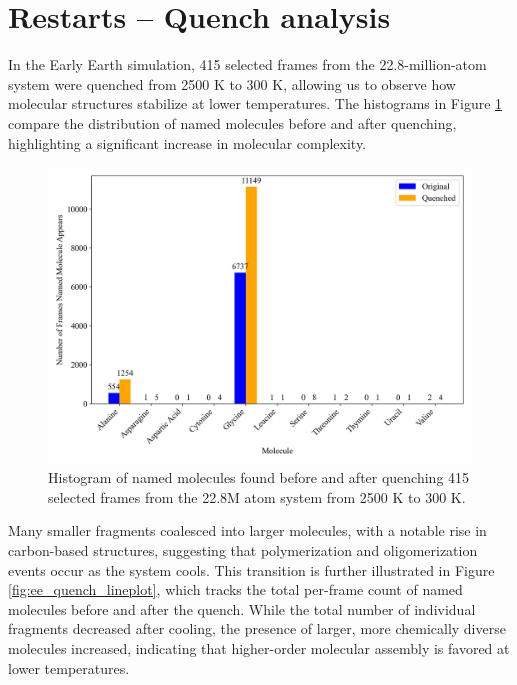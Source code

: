 \section{Restarts -- Quench analysis}
\label{sec:restarts_quench_analysis}

In the Early Earth simulation, 415 selected frames from the 22.8-million-atom system were quenched from 2500 K to 300 K, allowing us to observe how molecular structures stabilize at lower temperatures. The histograms in Figure \ref{fig:ee_quench_hist} compare the distribution of named molecules before and after quenching, highlighting a significant increase in molecular complexity. 

\begin{figure}[!h]
    \centering
    \includegraphics[width=1\linewidth]{Images/early_earth/hist-before-after-quench.png}
    \caption[Histogram: molecules found before and after quenching system]{Histogram of named molecules found before and after quenching 415 selected frames from the 22.8M atom system from 2500 K to 300 K.}
    \label{fig:ee_quench_hist}
\end{figure}

Many smaller fragments coalesced into larger molecules, with a notable rise in carbon-based structures, suggesting that polymerization and oligomerization events occur as the system cools.
This transition is further illustrated in Figure \ref{fig:ee_quench_lineplot}, which tracks the total per-frame count of named molecules before and after the quench. While the total number of individual fragments decreased after cooling, the presence of larger, more chemically diverse molecules increased, indicating that higher-order molecular assembly is favored at lower temperatures.

